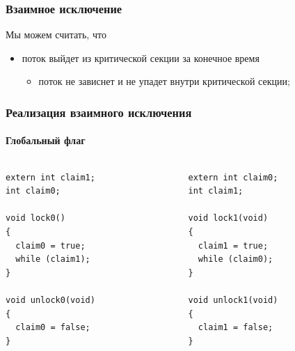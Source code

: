 \begin{frame}
\frametitle{Взаимное исключение}

Мы можем считать, что
\begin{itemize}
  \item поток выйдет из критической секции за конечное время
        \begin{itemize}
          \item поток не зависнет и не упадет внутри критической секции;
        \end{itemize}
\end{itemize}

\end{frame}

\begin{frame}[fragile]
\frametitle{Реализация взаимного исключения}
\framesubtitle{Глобальный флаг}

\begin{columns}[T]
  \begin{column}{.45\linewidth}
    \begin{lstlisting}
extern int claim1;
int claim0;

void lock0()
{
  claim0 = true;
  while (claim1);
}

void unlock0(void)
{
  claim0 = false;
}
    \end{lstlisting}
  \end{column}
  \begin{column}{.45\linewidth}
    \begin{lstlisting}
extern int claim0;
int claim1;

void lock1(void)
{
  claim1 = true;
  while (claim0);
}

void unlock1(void)
{
  claim1 = false;
}
    \end{lstlisting}
  \end{column}
\end{columns}
\end{frame}

